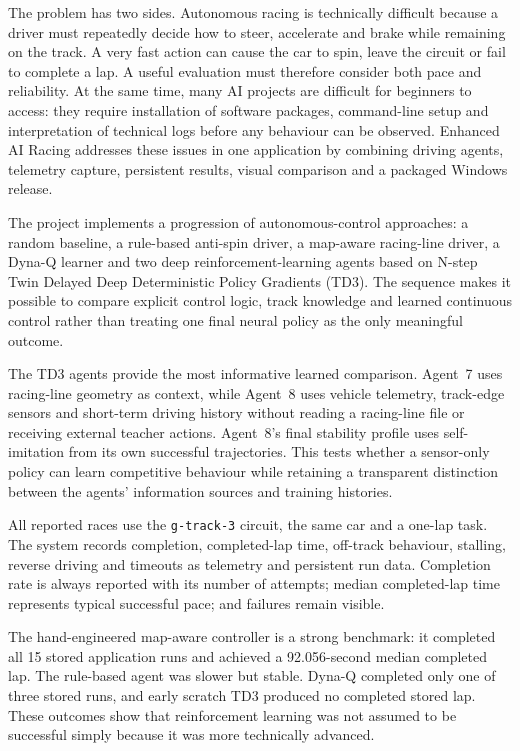 \documentclass[12pt,a4paper]{article}
\numberwithin{figure}{section}
\numberwithin{table}{section}
\begin{document}
The problem has two sides. Autonomous racing is technically difficult because a driver must repeatedly decide how to steer, accelerate and brake while remaining on the track. A very fast action can cause the car to spin, leave the circuit or fail to complete a lap. A useful evaluation must therefore consider both pace and reliability. At the same time, many AI projects are difficult for beginners to access: they require installation of software packages, command-line setup and interpretation of technical logs before any behaviour can be observed. Enhanced AI Racing addresses these issues in one application by combining driving agents, telemetry capture, persistent results, visual comparison and a packaged Windows release.

The project implements a progression of autonomous-control approaches: a random baseline, a rule-based anti-spin driver, a map-aware racing-line driver, a Dyna-Q learner and two deep reinforcement-learning agents based on N-step Twin Delayed Deep Deterministic Policy Gradients (TD3). The sequence makes it possible to compare explicit control logic, track knowledge and learned continuous control rather than treating one final neural policy as the only meaningful outcome.

The TD3 agents provide the most informative learned comparison. Agent~7 uses racing-line geometry as context, while Agent~8 uses vehicle telemetry, track-edge sensors and short-term driving history without reading a racing-line file or receiving external teacher actions. Agent~8's final stability profile uses self-imitation from its own successful trajectories. This tests whether a sensor-only policy can learn competitive behaviour while retaining a transparent distinction between the agents' information sources and training histories.

All reported races use the \texttt{g-track-3} circuit, the same car and a one-lap task. The system records completion, completed-lap time, off-track behaviour, stalling, reverse driving and timeouts as telemetry and persistent run data. Completion rate is always reported with its number of attempts; median completed-lap time represents typical successful pace; and failures remain visible.

The hand-engineered map-aware controller is a strong benchmark: it completed all 15 stored application runs and achieved a 92.056-second median completed lap. The rule-based agent was slower but stable. Dyna-Q completed only one of three stored runs, and early scratch TD3 produced no completed stored lap. These outcomes show that reinforcement learning was not assumed to be successful simply because it was more technically advanced.
\end{document}
